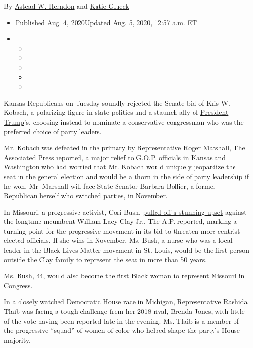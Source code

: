 By \href{https://www.nytimes.com/by/astead-w-herndon}{Astead W. Herndon}
and \href{https://www.nytimes.com/by/katie-glueck}{Katie Glueck}

\begin{itemize}
\item
  Published Aug. 4, 2020Updated Aug. 5, 2020, 12:57 a.m. ET
\item
  \begin{itemize}
  \item
  \item
  \item
  \item
  \item
  \end{itemize}
\end{itemize}

Kansas Republicans on Tuesday soundly rejected the Senate bid of Kris W.
Kobach, a polarizing figure in state politics and a staunch ally of
\href{https://www.nytimes.com/interactive/2020/us/elections/donald-trump.html}{President
Trump}'s, choosing instead to nominate a conservative congressman who
was the preferred choice of party leaders.

Mr. Kobach was defeated in the primary by Representative Roger Marshall,
The Associated Press reported, a major relief to G.O.P. officials in
Kansas and Washington who had worried that Mr. Kobach would uniquely
jeopardize the seat in the general election and would be a thorn in the
side of party leadership if he won. Mr. Marshall will face State Senator
Barbara Bollier, a former Republican herself who switched parties, in
November.

In Missouri, a progressive activist, Cori Bush,
\href{https://www.nytimes.com/2020/08/05/us/politics/cori-bush-missouri-william-lacy-clay.html}{pulled
off a stunning upset} against the longtime incumbent William Lacy Clay
Jr., The A.P. reported, marking a turning point for the progressive
movement in its bid to threaten more centrist elected officials. If she
wins in November, Ms. Bush, a nurse who was a local leader in the Black
Lives Matter movement in St. Louis, would be the first person outside
the Clay family to represent the seat in more than 50 years.

Ms. Bush, 44, would also become the first Black woman to represent
Missouri in Congress.

In a closely watched Democratic House race in Michigan, Representative
Rashida Tlaib was facing a tough challenge from her 2018 rival, Brenda
Jones, with little of the vote having been reported late in the evening.
Ms. Tlaib is a member of the progressive ``squad'' of women of color who
helped shape the party's House majority.

